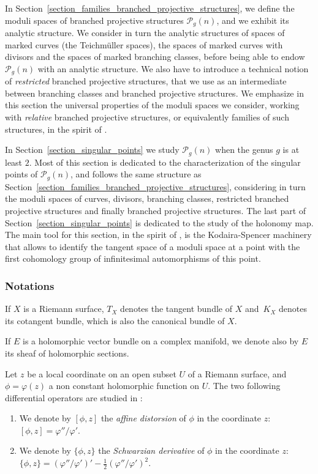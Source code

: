 \documentclass[10pt]{amsart}
\theoremstyle{definition}
\theoremstyle{plain}
\begin{document}
In Section~\ref{section_families_branched_projective_structures}, we define the moduli spaces of branched projective structures $\mathcal P_g(n)$, and we exhibit its analytic structure.
We consider in turn the analytic structures of spaces of marked curves (the Teichmüller spaces), the spaces of marked curves with divisors and the spaces of marked branching classes, before being able to endow $\mathcal P_g(n)$ with an analytic structure.
We also have to introduce a technical notion of \emph{restricted} branched projective structures, that we use as an intermediate between branching classes and branched projective structures.
We emphasize in this section the universal properties of the moduli spaces we consider, working with \emph{relative} branched projective structures, or equivalently families of such structures, in the spirit of \cite{hubbard}.

In Section~\ref{section_singular_points} we study $\mathcal P_g(n)$ when the genus $g$ is at least $2$.
Most of this section is dedicated to the characterization of the singular points of $\mathcal P_g(n)$, and follows the same structure as Section~\ref{section_families_branched_projective_structures}, considering in turn the moduli spaces of curves, divisors, branching classes, restricted branched projective structures and finally branched projective structures.
The last part of Section~\ref{section_singular_points} is dedicated to the study of the holonomy map.
The main tool for this section, in the spirit of \cite{hubbard}, is the Kodaira-Spencer machinery that allows to identify the tangent space of a moduli space at a point with the first cohomology group of infinitesimal automorphisms of this point.

\subsubsection*{Notations}

If $X$ is a Riemann surface, $T_X$ denotes the tangent bundle of $X$ and~$K_X$ denotes its cotangent bundle, which is also the canonical bundle of $X$.

If $E$ is a holomorphic vector bundle on a complex manifold, we denote also by $E$ its sheaf of holomorphic sections.

Let $z$ be a local coordinate on an open subset $U$ of a Riemann surface, and $\phi = \varphi(z)$ a non constant holomorphic function on $U$. The two following differential operators are studied in \cite{gunning}:
\begin{enumerate}
\item
We denote by $[\phi, z]$ the \emph{affine distorsion} of $\phi$ in the coordinate $z$: $[\phi, z] = \varphi''/\varphi'$.
\item
We denote by $\{\phi, z\}$ the \emph{Schwarzian derivative} of $\phi$ in the coordinate $z$: $\{\phi, z\} = \left(\varphi''/\varphi'\right)' - \frac 12 \left(\varphi''/\varphi'\right)^2$.
\end{enumerate}
\end{document}
